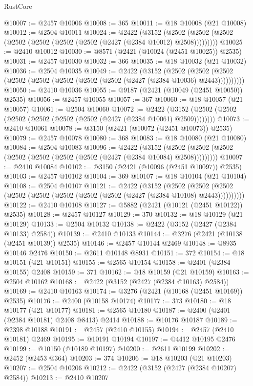 \begin{lexlean}{RustCore}
\begin{coremodule}
@10007 := @2457 @10006
@10008 := 365
@10011 := @18 @10008 (@21 @10008)
@10012 := @2504 @10011
@10024 := @2422
    (@3152 (@2502 (@2502 (@2502 (@2502 (@2502 (@2502 (@2502 (@2427 (@2384 @10012) @2508)))))))))
@10025 := @2410 @10012
@10030 := @8571 (@2421 (@10024 (@2451 @10025)) @2535)
@10031 := @2457 @10030
@10032 := 366
@10035 := @18 @10032 (@21 @10032)
@10036 := @2504 @10035
@10049 := @2422
    (@3152
      (@2502 (@2502 (@2502 (@2502 (@2502 (@2502 (@2502 (@2502 (@2427 (@2384 @10036) @2443))))))))))
@10050 := @2410 @10036
@10055 := @9187 (@2421 (@10049 (@2451 @10050)) @2535)
@10056 := @2457 @10055
@10057 := 367
@10060 := @18 @10057 (@21 @10057)
@10061 := @2504 @10060
@10072 := @2422 (@3152 (@2502 (@2502 (@2502 (@2502 (@2502 (@2502 (@2427 (@2384 @10061) @2509))))))))
@10073 := @2410 @10061
@10078 := @3150 (@2421 (@10072 (@2451 @10073)) @2535)
@10079 := @2457 @10078
@10080 := 368
@10083 := @18 @10080 (@21 @10080)
@10084 := @2504 @10083
@10096 := @2422
    (@3152 (@2502 (@2502 (@2502 (@2502 (@2502 (@2502 (@2502 (@2427 (@2384 @10084) @2508)))))))))
@10097 := @2410 @10084
@10102 := @3150 (@2421 (@10096 (@2451 @10097)) @2535)
@10103 := @2457 @10102
@10104 := 369
@10107 := @18 @10104 (@21 @10104)
@10108 := @2504 @10107
@10121 := @2422
    (@3152
      (@2502 (@2502 (@2502 (@2502 (@2502 (@2502 (@2502 (@2502 (@2427 (@2384 @10108) @2443))))))))))
@10122 := @2410 @10108
@10127 := @5882 (@2421 (@10121 (@2451 @10122)) @2535)
@10128 := @2457 @10127
@10129 := 370
@10132 := @18 @10129 (@21 @10129)
@10133 := @2504 @10132
@10138 := @2422 (@3152 (@2427 (@2384 @10133) @2584))
@10139 := @2410 @10133
@10144 := @3276 (@2421 (@10138 (@2451 @10139)) @2535)
@10146 := @2457 @10144 @2469
@10148 := @8935 @10146 @2476
@10150 := @2611 @10148 @8931
@10151 := 372
@10154 := @18 @10151 (@21 @10151)
@10155 := @2565 @10154
@10158 := @2401 (@2384 @10155) @2408
@10159 := 371
@10162 := @18 @10159 (@21 @10159)
@10163 := @2504 @10162
@10168 := @2422 (@3152 (@2427 (@2384 @10163) @2584))
@10169 := @2410 @10163
@10174 := @3276 (@2421 (@10168 (@2451 @10169)) @2535)
@10176 := @2400 (@10158 @10174)
@10177 := 373
@10180 := @18 @10177 (@21 @10177)
@10181 := @2565 @10180
@10187 := @2400 (@2401 (@2384 @10181) @2408 @8413) @2414
@10188 := @10176 @10187
@10189 := @2398 @10188
@10191 := @2457 (@2410 @10155)
@10194 := @2457 (@2410 @10181) @2469
@10195 := @10191 @10194
@10197 := @4412 @10195 @2476
@10199 := @10150 (@10189 @10197)
@10200 := @2611 @10199
@10202 := @2452 (@2453 @364)
@10203 := 374
@10206 := @18 @10203 (@21 @10203)
@10207 := @2504 @10206
@10212 := @2422 (@3152 (@2427 (@2384 @10207) @2584))
@10213 := @2410 @10207

\end{coremodule}
\end{lexlean}
